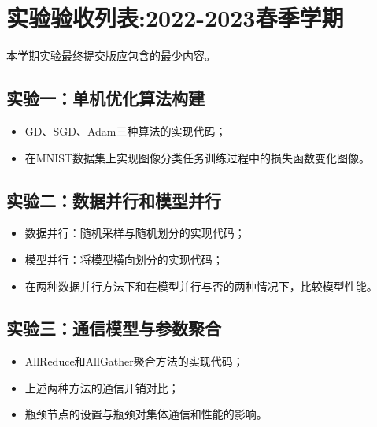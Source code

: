\chapter{实验验收列表:2022-2023春季学期}

本学期实验最终提交版应包含的最少内容。

\section{实验一：单机优化算法构建}
\begin{itemize}
    \item GD、SGD、Adam三种算法的实现代码；
    \item 在MNIST数据集上实现图像分类任务训练过程中的损失函数变化图像。
\end{itemize}

\section{实验二：数据并行和模型并行}
\begin{itemize}
    \item 数据并行：随机采样与随机划分的实现代码；
    \item 模型并行：将模型横向划分的实现代码；
    \item 在两种数据并行方法下和在模型并行与否的两种情况下，比较模型性能。
\end{itemize}

\section{实验三：通信模型与参数聚合}
\begin{itemize}
    \item AllReduce和AllGather聚合方法的实现代码；
    \item 上述两种方法的通信开销对比；
    \item 瓶颈节点的设置与瓶颈对集体通信和性能的影响。
\end{itemize}